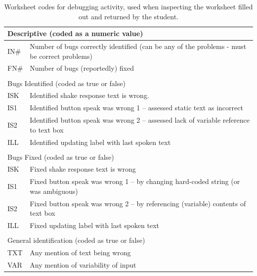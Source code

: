 \begin{table}
\begin{centering}
	\begin{tabular}{lp{13cm}}
	\multicolumn{2}{l}{Descriptive (coded as a numeric value)} 	\\ \hline
	IN\# 	& Number of bugs correctly identified (can be any of the problems - must be correct problems)	\\
	FN\#	& Number of bugs (reportedly) fixed															\\
	\\

	\multicolumn{2}{l}{Bugs Identified (coded as true or false)} 	\\ \hline
	ISK 	& Identified shake response text is wrong.	\\
	IS1		& Identified button speak was wrong 1 -- assessed static text as incorrect					\\
	IS2		& Identified button speak was wrong 2 -- assessed lack of variable reference to text box		\\
	ILL		& Identified updating label with last spoken text												\\
	\\

	\multicolumn{2}{l}{Bugs Fixed (coded as true or false)} 	\\ \hline
	ISK 	& Fixed shake response text is wrong	\\
	IS1		& Fixed button speak was wrong 1 -- by changing hard-coded string (or was ambiguous)	\\
	IS2		& Fixed button speak was wrong 2 -- by referencing (variable) contents of text box	\\
	ILL		& Fixed updating label with last spoken text											\\
	\\

	\multicolumn{2}{l}{General identification (coded as true or false)} 	\\ \hline
	TXT 	& Any mention of text being wrong	\\
	VAR		& Any mention of variability of input		\\

	\end{tabular}
	\caption[Worksheet codes for debugging activity]{Worksheet codes for debugging activity, used when inspecting the worksheet filled out and returned by the student.}
	\label{tab:debug-worksheet-codes}
\end{centering}
\end{table}

